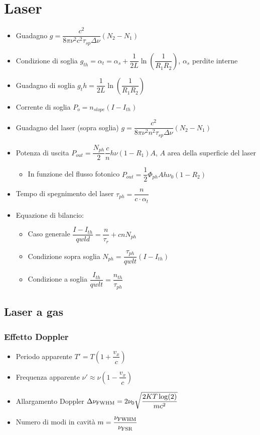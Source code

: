 \documentclass[9pt]{extarticle}
\begin{document}
\newpage

\section{Laser}

\begin{itemize}
  \item Guadagno \( g = \dfrac{c^2}{8 \pi \nu^2 c^2 \tau_{sp} \Delta \nu} (N_2 - N_1) \)
  \item Condizione di soglia \( g_{th} = \alpha_t = \alpha_s + \dfrac{1}{2L} \ln\left(\dfrac{1}{R_1 R_2}\right) \), \( \alpha_s \) perdite interne
  \item Guadagno di soglia \( g_th = \dfrac{1}{2L} \ln\left(\dfrac{1}{R_1 R_2}\right)\)
  \item Corrente di soglia \( P_o = n_{slope} (I - I_{th}) \)
  \item Guadagno del laser (sopra soglia) \( g = \dfrac{c^2}{8 \pi \nu^2 n ^ 2 \tau_{sp} \Delta \nu} (N_2 - N_1) \)
  \item Potenza di uscita \( P_{out} = \dfrac{N_{ph}}{2} \dfrac{c}{n} h \nu (1 - R_1) A \), \( A \) area della superficie del laser
        \begin{itemize}
          \item In funzione del flusso fotonico \( P_{out} = \dfrac{1}{2} \Phi_{ph} A h \nu_0 ( 1 - R_2) \)
        \end{itemize}
  \item Tempo di spegnimento del laser \( \tau_{ph} = \dfrac{n}{c \cdot \alpha_t} \)
  \item Equazione di bilancio:
        \begin{itemize}
          \item Caso generale \( \dfrac{I - I_{th}}{q w l d} = \dfrac{n}{\tau_r} + c n N_{ph} \)
          \item Condizione sopra soglia \( N_{ph} = \dfrac{\tau_{ph}}{q w l t} (I - I_{th}) \)
          \item Condizione a soglia \( \dfrac {I_{th}}{q w l t} = \dfrac{n_{th}}{\tau_{ph} } \)
        \end{itemize}
\end{itemize}

\subsection{Laser a gas}
\subsubsection{Effetto Doppler}
\begin{itemize}
  \item Periodo apparente \( T ' = T \left( 1 + \dfrac{v_x}{c} \right) \)
  \item Frequenza apparente \( \nu ' \approx \nu \left(1 - \dfrac{v_x}{c} \right) \)
  \item Allargamento Doppler \( \Delta \nu_{\textnormal{FWHM}} = 2 \nu_0 \sqrt{\dfrac{2 K T \log(2)}{m c ^ 2}} \)
  \item Numero di modi in cavità \(m = \dfrac{ \nu_{\textnormal{FWHM}}}{ \nu_{\textnormal{FSR}}} \)
\end{itemize}
\end{document}
